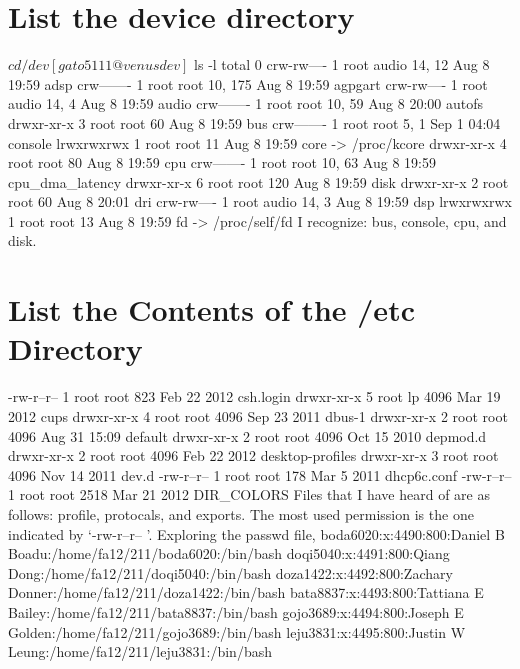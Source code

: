 \documentclass[12pt]{book}
\newenvironment{code}{ \verbatimtab  }{ \endverbatimtab }
\begin{document}
\section{List the device directory}
\begin{code}
[gato5111@venus bin]$ cd /dev
[gato5111@venus dev]$ ls -l
total 0
crw-rw---- 1 root audio  14,   12 Aug  8 19:59 adsp
crw------- 1 root root   10,  175 Aug  8 19:59 agpgart
crw-rw---- 1 root audio  14,    4 Aug  8 19:59 audio
crw------- 1 root root   10,   59 Aug  8 20:00 autofs
drwxr-xr-x 3 root root         60 Aug  8 19:59 bus
crw------- 1 root root    5,    1 Sep  1 04:04 console
lrwxrwxrwx 1 root root         11 Aug  8 19:59 core -> /proc/kcore
drwxr-xr-x 4 root root         80 Aug  8 19:59 cpu
crw------- 1 root root   10,   63 Aug  8 19:59 cpu_dma_latency
drwxr-xr-x 6 root root        120 Aug  8 19:59 disk
drwxr-xr-x 2 root root         60 Aug  8 20:01 dri
crw-rw---- 1 root audio  14,    3 Aug  8 19:59 dsp
lrwxrwxrwx 1 root root         13 Aug  8 19:59 fd -> /proc/self/fd
\end{code}
I recognize: bus, console, cpu, and disk. 

\section{List the Contents of the /etc Directory}

\begin{code}
-rw-r--r--  1 root   root        823 Feb 22  2012 csh.login
drwxr-xr-x  5 root   lp         4096 Mar 19  2012 cups
drwxr-xr-x  4 root   root       4096 Sep 23  2011 dbus-1
drwxr-xr-x  2 root   root       4096 Aug 31 15:09 default
drwxr-xr-x  2 root   root       4096 Oct 15  2010 depmod.d
drwxr-xr-x  2 root   root       4096 Feb 22  2012 desktop-profiles
drwxr-xr-x  3 root   root       4096 Nov 14  2011 dev.d
-rw-r--r--  1 root   root        178 Mar  5  2011 dhcp6c.conf
-rw-r--r--  1 root   root       2518 Mar 21  2012 DIR_COLORS
\end{code}
Files that I have heard of are as follows: profile, protocals, and exports. 
The most used permission is the one indicated by  `-rw-r--r-- '. 
Exploring the passwd file, 
\begin{code}
boda6020:x:4490:800:Daniel B Boadu:/home/fa12/211/boda6020:/bin/bash
doqi5040:x:4491:800:Qiang Dong:/home/fa12/211/doqi5040:/bin/bash
doza1422:x:4492:800:Zachary Donner:/home/fa12/211/doza1422:/bin/bash
bata8837:x:4493:800:Tattiana E Bailey:/home/fa12/211/bata8837:/bin/bash
gojo3689:x:4494:800:Joseph E Golden:/home/fa12/211/gojo3689:/bin/bash
leju3831:x:4495:800:Justin W Leung:/home/fa12/211/leju3831:/bin/bash
\end{code}
\end{document}
